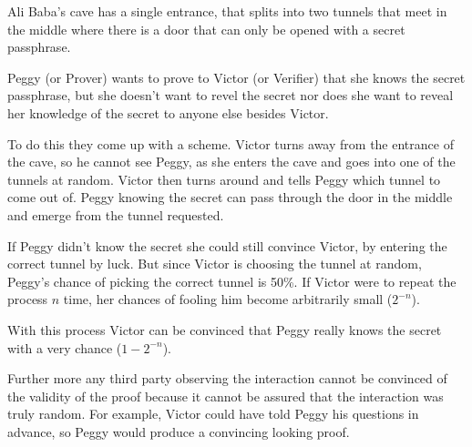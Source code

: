 \bigskip

Ali Baba's cave has a single entrance, that splits into two tunnels that meet in the middle where there is a door that can only be opened with a secret passphrase.

\bigskip

Peggy (or Prover) wants to prove to Victor (or Verifier) that she knows the secret passphrase, but she doesn't want to revel the secret nor does she want to reveal her knowledge of the secret to anyone else besides Victor.

\bigskip

To do this they come up with a scheme.
Victor turns away from the entrance of the cave, so he cannot see Peggy, as she enters the cave and goes into one of the tunnels at random. 
Victor then turns around and tells Peggy which tunnel to come out of.
Peggy knowing the secret can pass through the door in the middle and emerge from the tunnel requested.

\bigskip

If Peggy didn't know the secret she could still convince Victor, by entering the correct tunnel by luck.
But since Victor is choosing the tunnel at random, Peggy's chance of picking the correct tunnel is 50\%. If Victor were to repeat the process $n$ time, her chances of fooling him become arbitrarily small ($2^{-n}$).

With this process Victor can be convinced that Peggy really knows the secret with a very chance ($1 - 2^{-n}$).

\bigskip

Further more any third party observing the interaction cannot be convinced of the validity of the proof because it cannot be assured that the interaction was truly random. 
For example, Victor could have told Peggy his questions in advance, so Peggy would produce a convincing looking proof.